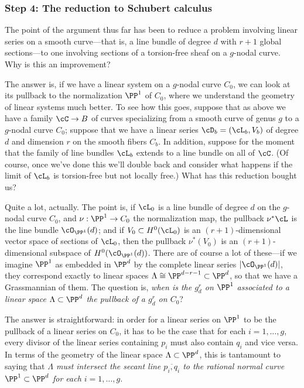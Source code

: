 \subsubsection{Step 4: The reduction to Schubert calculus}

The point of the argument thus far has been to reduce a problem involving linear series on a smooth curve---that is, a line bundle of degree $d$ with $r+1$ global sections---to one involving sections of a torsion-free sheaf on a $g$-nodal curve. Why is this an improvement? 

The answer is, if we have a linear system on a $g$-nodal curve $C_0$, we can look at its pullback to the normalization $\PP^1$ of $C_0$, where we understand the geometry of linear systems much better. To see how this goes, suppose that as above we have a family $\cC \to B$ of curves specializing from a smooth curve of genus $g$ to a $g$-nodal curve $C_0$; suppose that we have a linear series $\cD_b = (\cL_b, V_b)$ of degree $d$ and dimension $r$ on the smooth fibers $C_b$. In addition, suppose for the moment that the family of line bundles $\cL_b$ extends to a line bundle on all of $\cC$. (Of course, once we've done this we'll double back and consider what happens if the limit of $\cL_b$ is torsion-free but not locally free.) What has this reduction bought us?

Quite a lot, actually. The point is, if $\cL_0$ is a line bundle of degree $d$ on the $g$-nodal curve $C_0$, and $\nu : \PP^1 \to C_0$ the normalization map, the pullback $\nu^*\cL$ is the line bundle $\cO_{\PP^1}(d)$; and if $V_0 \subset H^0(\cL_0)$ is an $(r+1)$-dimensional vector space of sections of $\cL_0$, then the pullback $\nu^*(V_0)$ is  an $(r+1)$-dimensional subspace of $H^0(\cO_{\PP^1}(d))$. There are of course a lot of these---if we imagine $\PP^1$ as embedded in $\PP^d$ by the complete linear series $|\cO_{\PP^1}(d)|$, they correspond exactly to linear spaces $\Lambda \cong \PP^{d-r-1} \subset \PP^d$, so that we have a Grassmannian of them. The question is, \emph{when is the $g^r_d$ on $\PP^1$ associated to a linear space $\Lambda \subset \PP^d$ the pullback of a $g^r_d$ on $C_0$}?

The answer is straightforward: in order for a linear series on $\PP^1$ to be the pullback of a linear series on $C_0$, it has to be the case that for each $i = 1,\dots, g$, every divisor of the linear series containing $p_i$ must also contain $q_i$ and vice versa. In terms of the geometry of the linear space $\Lambda \subset \PP^d$, this is tantamount to saying that \emph{$\Lambda$ must intersect the secant line $\overline{p_i,q_i}$ to the rational normal curve $\PP^1 \subset \PP^d$ for each $i=1,\dots,g$}.

